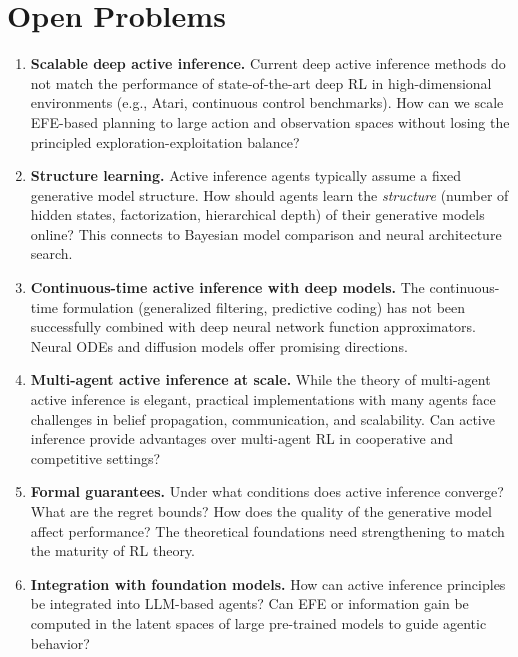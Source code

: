 \documentclass[11pt,a4paper]{article}
\theoremstyle{definition}
\begin{document}
\section{Open Problems}
\label{sec:open}

\begin{enumerate}[leftmargin=2em]
  \item \textbf{Scalable deep active inference.}
    Current deep active inference methods do not match the performance of
    state-of-the-art deep RL in high-dimensional environments (e.g., Atari,
    continuous control benchmarks).  How can we scale EFE-based planning to
    large action and observation spaces without losing the principled
    exploration-exploitation balance?

  \item \textbf{Structure learning.}
    Active inference agents typically assume a fixed generative model
    structure.  How should agents learn the \emph{structure} (number of hidden
    states, factorization, hierarchical depth) of their generative models
    online?  This connects to Bayesian model comparison and neural
    architecture search.

  \item \textbf{Continuous-time active inference with deep models.}
    The continuous-time formulation (generalized filtering, predictive coding)
    has not been successfully combined with deep neural network function
    approximators.  Neural ODEs and diffusion models offer promising
    directions.

  \item \textbf{Multi-agent active inference at scale.}
    While the theory of multi-agent active inference is elegant, practical
    implementations with many agents face challenges in belief propagation,
    communication, and scalability.  Can active inference provide advantages
    over multi-agent RL in cooperative and competitive settings?

  \item \textbf{Formal guarantees.}
    Under what conditions does active inference converge?  What are the regret
    bounds?  How does the quality of the generative model affect performance?
    The theoretical foundations need strengthening to match the maturity of
    RL theory.

  \item \textbf{Integration with foundation models.}
    How can active inference principles be integrated into LLM-based agents?
    Can EFE or information gain be computed in the latent spaces of large
    pre-trained models to guide agentic behavior?


\end{enumerate}
\end{document}
